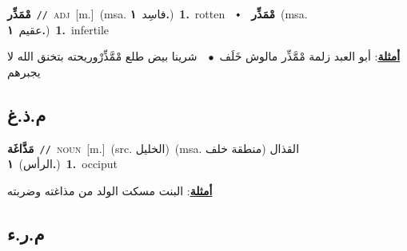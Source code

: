 \documentclass[10pt,a4paper,twoside]{article} %
\begin{document}
\begin{multicols}{2}
{\setlength\topsep{0pt}\textbf{\foreignlanguage{arabic}{مْمَذِّر}}\ {\color{gray}\texttt{//}\color{black}}\ \textsc{adj}\ [m.]\ \color{gray}(msa. \foreignlanguage{arabic}{فاسِد}~\foreignlanguage{arabic}{\textbf{١.}})\color{black}\ \textbf{1.}~rotten\ \ $\smblkdiamond$\ \ \setlength\topsep{0pt}\textbf{\foreignlanguage{arabic}{مْمَذِّر}}\ \color{gray}(msa. \foreignlanguage{arabic}{عقيم}~\foreignlanguage{arabic}{\textbf{١.}})\color{black}\ \textbf{1.}~infertile\  \begin{flushright}\color{gray}\foreignlanguage{arabic}{\textbf{\underline{\foreignlanguage{arabic}{أمثلة}}}: أبو العبد زلمة مْمَّذِّر مالوش خَلَف\ $\bullet$\ \  شرينا بيض طلع مْمَّذِّرْوريحته بتخنق الله لا يجبرهم}\end{flushright}\color{black}} \vspace{2mm}

\vspace{-3mm}
\subsection*{\color{blue}\foreignlanguage{arabic}{م.ذ.غ}\color{blue}{}} 

{\setlength\topsep{0pt}\textbf{\foreignlanguage{arabic}{مَذَّاغَة}}\ {\color{gray}\texttt{//}\color{black}}\ \textsc{noun}\ [m.]\ (src. \color{gray}\foreignlanguage{arabic}{الخليل}\color{black})\ \color{gray}(msa. \foreignlanguage{arabic}{القذال (منطقة خلف الرأس)}~\foreignlanguage{arabic}{\textbf{١.}})\color{black}\ \textbf{1.}~occiput\  \begin{flushright}\color{gray}\foreignlanguage{arabic}{\textbf{\underline{\foreignlanguage{arabic}{أمثلة}}}: البنت مسكت الولد من مذاغته وضربته}\end{flushright}\color{black}} \vspace{2mm}

\vspace{-3mm}
\subsection*{\color{blue}\foreignlanguage{arabic}{م.ر.ء}\color{blue}{}} 


\end{multicols}
\end{document}
